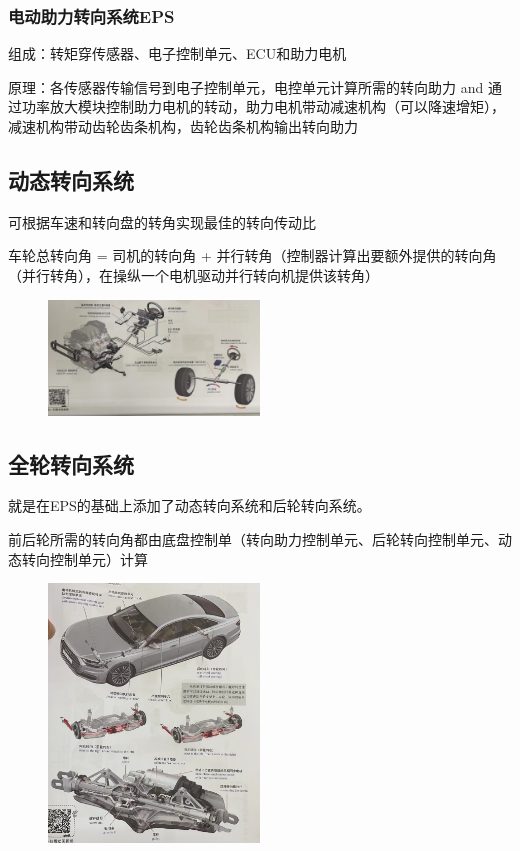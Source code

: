 	\subsubsection{电动助力转向系统EPS}
		组成：转矩穿传感器、电子控制单元、ECU和助力电机
		
		原理：各传感器传输信号到电子控制单元，电控单元计算所需的转向助力 and 通过功率放大模块控制助力电机的转动，助力电机带动减速机构（可以降速增矩），减速机构带动齿轮齿条机构，齿轮齿条机构输出转向助力
		
\subsection{动态转向系统}
	可根据车速和转向盘的转角实现最佳的转向传动比
	
	车轮总转向角 = 司机的转向角 + 并行转角（控制器计算出要额外提供的转向角（并行转角），在操纵一个电机驱动并行转向机提供该转角）
	\begin{figure}[htbp]
		\centering
		\includegraphics[width=0.5\textwidth]{5-8}
	\end{figure}

\subsection{全轮转向系统}
	就是在EPS的基础上添加了动态转向系统和后轮转向系统。
	
	前后轮所需的转向角都由底盘控制单（转向助力控制单元、后轮转向控制单元、动态转向控制单元）计算
	\begin{figure}[htbp]
		\centering
		\includegraphics[width=0.5\textwidth]{5-9}
	\end{figure}

